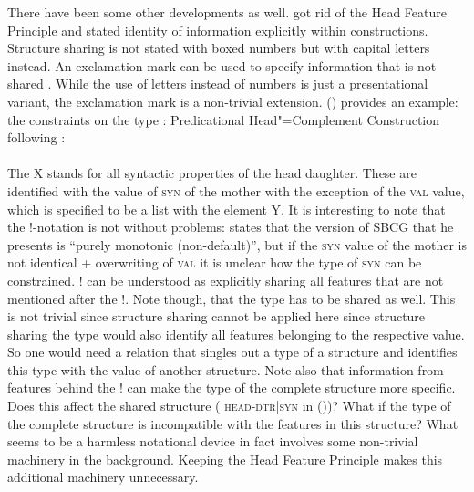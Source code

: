 \documentclass[output=paper]{langsci/langscibook}
\begin{document}
There have been some other developments as well. \citet{Sag2012a} got rid of the Head Feature
Principle and stated identity of information explicitly within constructions. Structure sharing is
not stated with boxed numbers but with capital letters instead. An exclamation mark can be used to
specify information that is not shared \citep[]{Sag2012a}. While the use of letters instead
of numbers is just a presentational variant, the exclamation mark is a non-trivial
extension. () provides an example: the constraints on the type :
\eas
Predicational Head"=Complement Construction following \citet[]{Sag2012a}:\\
 \impl\\
\zs
The X stands for all syntactic properties of the head daughter. These are identified with the
value of \textsc{syn} of the mother with the exception of the \textsc{val} value, which is specified
to be a list with the element Y. It is interesting to note that the !-notation is not without
problems: \citet[]{Sag2012a} states that the version of SBCG that he presents is ``purely
monotonic (non-default)'', but if the \textsc{syn} value of the mother is not identical +
overwriting of \textsc{val} it is unclear how the type of \textsc{syn} can be constrained. ! can be
understood as explicitly sharing all features that are not mentioned after the !. Note though, that
the type has to be shared as well. This is not trivial since structure sharing cannot be applied
here since structure sharing the type would also identify all features belonging to the respective
value. So one would need a relation that singles out a type of a structure and identifies this type
with the value of another structure. Note also that information from features behind the ! can make
the type of the complete structure more specific. Does this affect the shared structure (\eg
\textsc{head-dtr|syn} in ())? What if the
type of the complete structure is incompatible with the features in this structure? What seems to be a harmless notational device in fact involves some
non-trivial machinery in the background. Keeping the Head Feature Principle makes this additional machinery
unnecessary. 
\end{document}
